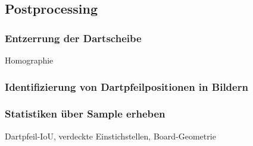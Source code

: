 \subsection{Postprocessing}  %
\label{sec:methodik_postprocessing}

\subsubsection{Entzerrung der Dartscheibe}

Homographie

\todo{}

\subsubsection{Identifizierung von Dartpfeilpositionen in Bildern}

\todo{}

\subsubsection{Statistiken über Sample erheben}

Dartpfeil-IoU, verdeckte Einstichstellen, Board-Geometrie

\todo{}

